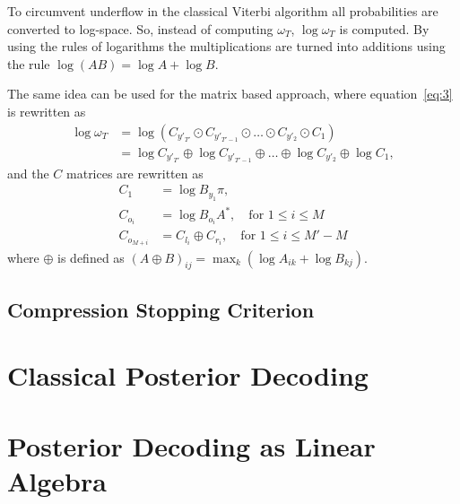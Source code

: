 To circumvent underflow in the classical Viterbi algorithm all probabilities
are converted to log-space. So, instead of computing $\omega_T$,
$\log \omega_T$ is computed. By using the rules of logarithms the
multiplications are turned into additions using the rule
$\log(AB) = \log A + \log B$. 

The same idea can be used for the matrix based approach, where
equation~\eqref{eq:3} is rewritten as
\begin{align*}
  \log \omega_T &= \log \left(C_{y'_{T'}} \odot C_{y'_{T'-1}} \odot \dots \odot
                  C_{y'_2} \odot C_1 \right) \\
                &= \log C_{y'_{T'}} \oplus \log C_{y'_{T'-1}} \oplus \dots \oplus
                  \log C_{y'_2} \oplus \log C_1,
\end{align*}
and the $C$ matrices are rewritten as
\begin{align*}
  C_1 &= \log B_{y_1} \pi, \\
  C_{o_i} &= \log B_{o_i} A^*, \quad \text{for }1 \le i \le M\\
  C_{o_{M + i}} &= C_{l_i} \oplus C_{r_i} , \quad \text{for }1 \le i \le M' - M
\end{align*}
where $\oplus$ is defined as
${ \left( A \oplus B \right)}_{ij} = \max_k \left( \log A_{ik} + \log B_{kj}
\right)$.


\subsection{Compression Stopping Criterion}
\label{sec:compr-stopp-crit}


\section{Classical Posterior Decoding}
\label{sec:posterior-decoding-1}




\section{Posterior Decoding as Linear Algebra}
\label{sec:post-decod-as}


